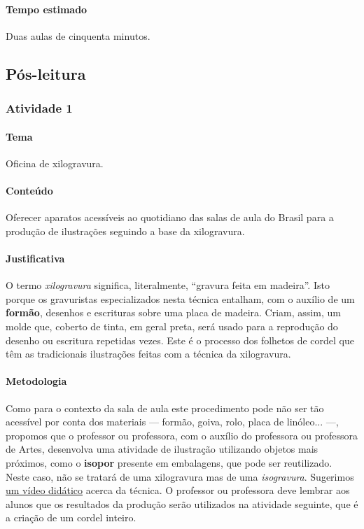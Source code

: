 \documentclass[11pt]{extarticle}
\begin{document}
\paragraph{Tempo estimado} Duas aulas de cinquenta minutos.


\subsection{Pós-leitura}

\subsubsection{Atividade 1} 

\paragraph{Tema} Oficina de xilogravura.

\paragraph{Conteúdo} Oferecer aparatos acessíveis ao quotidiano 
das salas de aula do Brasil para a produção de ilustrações
seguindo a base da xilogravura. 

\paragraph{Justificativa} O termo \textit{xilogravura} significa, literalmente, ``gravura feita em madeira''. 
Isto porque os gravuristas especializados nesta técnica entalham, com o auxílio de 
um \textbf{formão}, desenhos e escrituras sobre uma placa de madeira. 
Criam, assim, um molde que, coberto de tinta, em geral preta, será usado para a reprodução 
do desenho ou escritura repetidas vezes. 
Este é o processo dos folhetos de cordel que têm as tradicionais ilustrações feitas com
a técnica da xilogravura. 


\paragraph{Metodologia} Como para o contexto da sala de aula este procedimento pode não ser tão
acessível por conta dos materiais --- formão, goiva, rolo, placa de linóleo... ---,
propomos que o professor ou professora, com o auxílio do professora ou professora
de Artes, desenvolva uma atividade de ilustração utilizando objetos mais 
próximos, como o \textbf{isopor} presente em embalagens, que pode ser reutilizado.
Neste caso, não se tratará de uma xilogravura mas de uma \textit{isogravura}.
Sugerimos \href{https://www.youtube.com/watch?v=8sq9Qq-wrls}{um vídeo didático}
acerca da técnica. O professor ou
professora deve lembrar aos alunos que os resultados da produção serão utilizados
na atividade seguinte, que é a criação de um cordel inteiro. 
\end{document}
